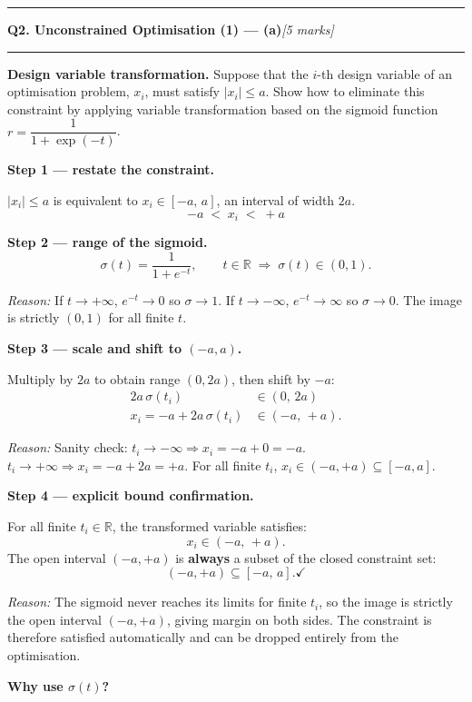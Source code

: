 \documentclass[10pt,a4paper]{article}
\newcommand{\sectitle}[2]{%
  \vspace{10pt}\noindent\rule{\linewidth}{0.8pt}\par\vspace{2pt}%
  {\large\textbf{#1}\hfill\normalsize\textit{[#2 marks]}}\par
  \vspace{2pt}\rule{\linewidth}{0.4pt}\vspace{4pt}}
\newcommand{\reason}[1]{%
  \begin{mdframed}[backgroundcolor=reasonbg, linewidth=0.4pt,
    innertopmargin=3pt, innerbottommargin=3pt,
    innerleftmargin=6pt, innerrightmargin=6pt]
    \small\textit{Reason:} \small #1
  \end{mdframed}\vspace{2pt}}
\begin{document}
\newpage
\sectitle{Q2. Unconstrained Optimisation (1) --- (a)}{5}

\noindent\textbf{Design variable transformation.} Suppose that the $i$-th design
variable of an optimisation problem, $x_i$, must satisfy $|x_i|\le a$.
Show how to eliminate this constraint by applying variable transformation
based on the sigmoid function $r = \dfrac{1}{1+\exp(-t)}$.

\vspace{6pt}
\textbf{Step 1 --- restate the constraint.}

$|x_i|\le a$ is equivalent to $x_i\in[-a,\,a]$, an interval of width $2a$.
\[
  -a \;<\; x_i \;<\; +a
\]

\textbf{Step 2 --- range of the sigmoid.}
\[
  \sigma(t)=\frac{1}{1+e^{-t}},\qquad t\in\mathbb{R}\;\Rightarrow\;\sigma(t)\in(0,1).
\]

\reason{If $t\to+\infty$, $e^{-t}\to 0$ so $\sigma\to 1$.
        If $t\to-\infty$, $e^{-t}\to\infty$ so $\sigma\to 0$.
        The image is strictly $(0,1)$ for all finite $t$.}

\textbf{Step 3 --- scale and shift to $(-a,a)$.}

Multiply by $2a$ to obtain range $(0,2a)$, then shift by $-a$:
\begin{align*}
  2a\,\sigma(t_i)             &\in (0,\,2a) \\
  x_i = -a + 2a\,\sigma(t_i) &\in (-a,\,+a).
\end{align*}

\reason{Sanity check: $t_i\to-\infty \Rightarrow x_i = -a+0 = -a$.
        $t_i\to+\infty \Rightarrow x_i = -a+2a = +a$.
        For all finite $t_i$, $x_i\in(-a,+a)\subseteq[-a,a]$. \checkmark}

\textbf{Step 4 --- explicit bound confirmation.}

For all finite $t_i\in\mathbb{R}$, the transformed variable satisfies:
\[
  x_i \in (-a,\,+a).
\]
The open interval $(-a,+a)$ is \textbf{always} a subset of the closed constraint set:
\[
  (-a,+a) \subseteq [-a,\,a]. \checkmark
\]
\reason{The sigmoid never reaches its limits for finite $t_i$, so the image is strictly
        the open interval $(-a,+a)$, giving margin on both sides. The constraint is
        therefore satisfied automatically and can be dropped entirely from the optimisation.}

\newpage
\textbf{Why use $\sigma(t)$?}
\end{document}
